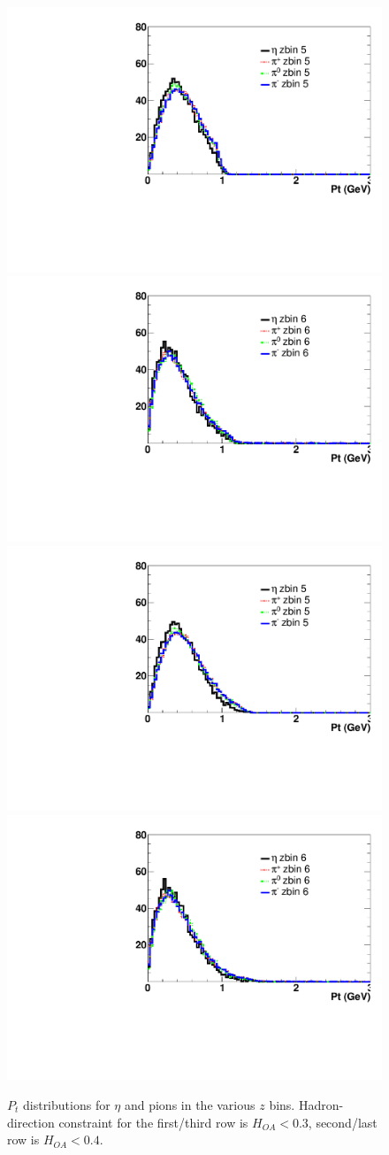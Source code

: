 \begin{figure}[H]
\includegraphics[width=.27\textwidth,natwidth=250,natheight=100]{figure_fiducial/had0.3_z0.3/Pt_distri_for_zbin_5_norm_had03z03.pdf}
\includegraphics[width=.27\textwidth,natwidth=250,natheight=100]{figure_fiducial/had0.3_z0.3/Pt_distri_for_zbin_6_norm_had03z03.pdf}\hfill\\
\includegraphics[width=.27\textwidth,natwidth=250,natheight=100]{figure_fiducial/had0.4_z0.3/Pt_distri_for_zbin_5_norm_had04z03.pdf}
\includegraphics[width=.27\textwidth,natwidth=250,natheight=100]{figure_fiducial/had0.4_z0.3/Pt_distri_for_zbin_6_norm_had04z03.pdf}\hfill
\caption[$P_t$ distributions for \(\eta\) and pions in the various $z$ bins]{$P_t$ distributions for \(\eta\) and pions in the various $z$ bins. Hadron-direction constraint for the first/third row is $H_{OA}<0.3$, second/last row is $H_{OA}<0.4$.}
\end{figure}

